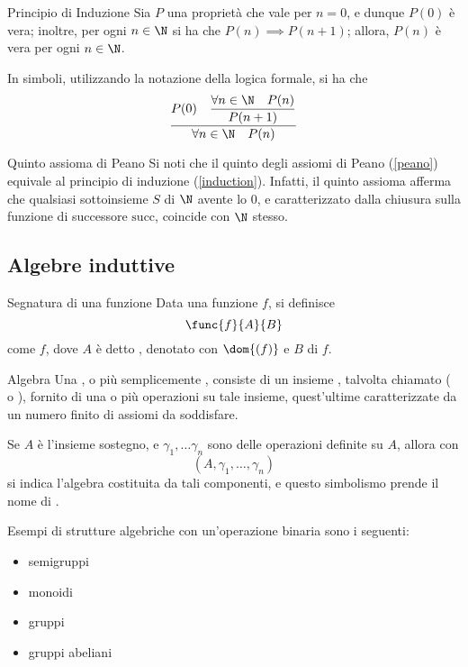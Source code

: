 \documentclass[a4paper, 12pt]{report}
\begin{document}
    \begin{framedprinc}[label={induction}]{Principio di Induzione}
        Sia $P$ una proprietà che vale per $n = 0$, e dunque $P(0)$ è vera; inoltre,  per ogni $n \in \N$ si ha che $P(n) \implies P(n + 1)$; allora, $P(n)$ è vera per ogni $n \in \N$.

        In simboli, utilizzando la notazione della logica formale, si ha che $$\dfrac{P(0) \quad \dfrac{\forall n \in \N \quad P(n)}{P(n + 1)}}{\forall n \in \N \quad P(n)}$$
    \end{framedprinc}

    \begin{framedobs}{Quinto assioma di Peano}
        Si noti che il quinto degli assiomi di Peano (\cref{peano}) equivale al principio di induzione (\cref{induction}). Infatti, il quinto assioma afferma che qualsiasi sottoinsieme $S$ di $\N$ avente lo 0, e caratterizzato dalla chiusura sulla funzione di successore $\mathrm{succ}$, coincide con $\N$ stesso.
    \end{framedobs}

    \subsection{Algebre induttive}

    \begin{frameddefn}{Segnatura di una funzione}
        Data una funzione $f$, si definisce $$\func{f}{A}{B}$$ come  $f$, dove $A$ è detto , denotato con $\dom{(f)}$ e $B$  di $f$.
    \end{frameddefn}

    \begin{frameddefn}{Algebra}
        Una , o più semplicemente , consiste di un insieme , talvolta chiamato  ( o ), fornito di una o più operazioni su tale insieme, quest'ultime caratterizzate da un numero finito di assiomi da soddisfare.

        Se $A$ è l'insieme sostegno, e $\gamma_1, \ldots \gamma_n$ sono delle operazioni definite su $A$, allora con $$(A, \gamma_1, \ldots, \gamma_n)$$ si indica l'algebra costituita da tali componenti, e questo simbolismo prende il nome di .
    \end{frameddefn}

    \begin{example}
        Esempi di strutture algebriche con un'operazione binaria sono i seguenti:

        \begin{itemize}
            \item semigruppi
            \item monoidi
            \item gruppi
            \item gruppi abeliani
        \end{itemize}
    \end{example}
\end{document}
